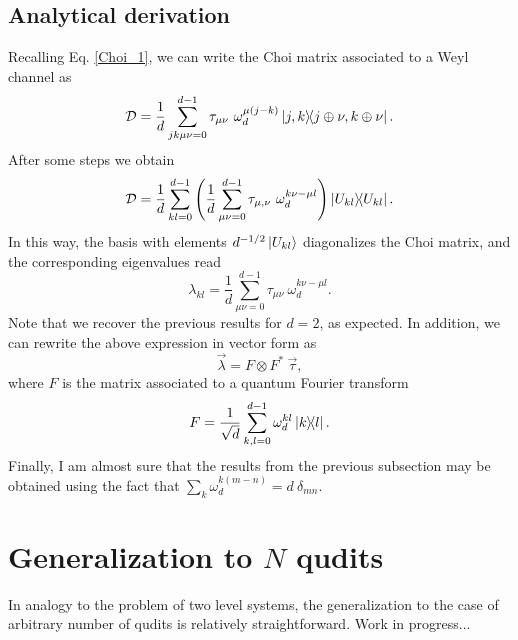 \subsection{Analytical derivation } %
% 
Recalling Eq. \ref{Choi_1}, we can write the Choi matrix associated to a Weyl channel as
% 
\begin{equation}
 \mathcal{D} =  \frac{1}{d}\sum_{jk\mu\nu=0}^{d-1} \tau_{\mu\nu}~ \omega_d^{\mu (j-k)} \dyad{j,k}{j\oplus \nu,k\oplus \nu}.
\end{equation}
% 
After some steps we obtain 
% 
\begin{equation}
 \mathcal{D} =  \frac{1}{d}\sum_{kl=0}^{d-1} \left(\frac{1}{d}\sum_{\mu\nu=0}^{d-1}\tau_{\mu,\nu}~ \omega_d^{k\nu -\mu l} \right)\dyad{U_{kl}}.
\end{equation}
% 
In this way, the basis with elements $d^{-1/2}\ket{U_{kl}}$ diagonalizes the Choi matrix, and the corresponding eigenvalues read
% 
\begin{equation}
 \lambda_{kl}=\frac{1}{d}\sum_{\mu\nu=0}^{d-1}\tau_{\mu\nu}~ \omega_d^{k\nu -\mu l}.
\end{equation}
% 
Note that we recover the previous results for $d=2$, as expected. In addition, we can rewrite the above expression in vector form as
% 
\begin{equation}
 \vec{\lambda}=F\otimes F^*~\vec{\tau},
\end{equation}
% 
where $F$ is the matrix associated to a quantum Fourier transform
% 
\begin{equation}
 F=\frac{1}{\sqrt{d}}\sum_{k,l=0}^{d-1}\omega_d^{kl}\dyad{k}{l}.
\end{equation}
% 
Finally, I am almost sure that the results from the previous subsection may be
obtained using the fact that $\sum_k\omega_d^{k(m-n)}=d~\delta_{mn}$.
\section{Generalization to $N$ qudits} %
% 
In analogy to the problem of two level systems, the generalization to the case
of arbitrary number of qudits is relatively straightforward. Work in
progress...


